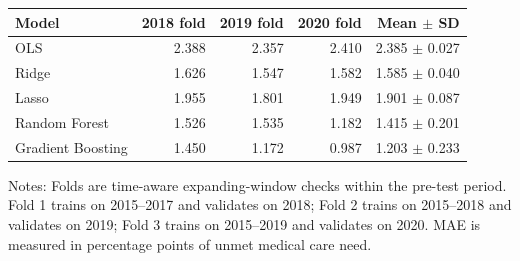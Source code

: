 \begin{tabular}{@{}lrrrr@{}}
\toprule
Model & 2018 fold & 2019 fold & 2020 fold & Mean \(\pm\) SD \\
\midrule
OLS & 2.388 & 2.357 & 2.410 & 2.385 $\pm$ 0.027 \\
Ridge & 1.626 & 1.547 & 1.582 & 1.585 $\pm$ 0.040 \\
Lasso & 1.955 & 1.801 & 1.949 & 1.901 $\pm$ 0.087 \\
Random Forest & 1.526 & 1.535 & 1.182 & 1.415 $\pm$ 0.201 \\
Gradient Boosting & 1.450 & 1.172 & 0.987 & 1.203 $\pm$ 0.233 \\
\bottomrule
\end{tabular}
\par\vspace{0.3em}
\begin{minipage}{0.96\textwidth}
\footnotesize Notes: Folds are time-aware expanding-window checks within the pre-test period. Fold 1 trains on 2015--2017 and validates on 2018; Fold 2 trains on 2015--2018 and validates on 2019; Fold 3 trains on 2015--2019 and validates on 2020. MAE is measured in percentage points of unmet medical care need.
\end{minipage}
